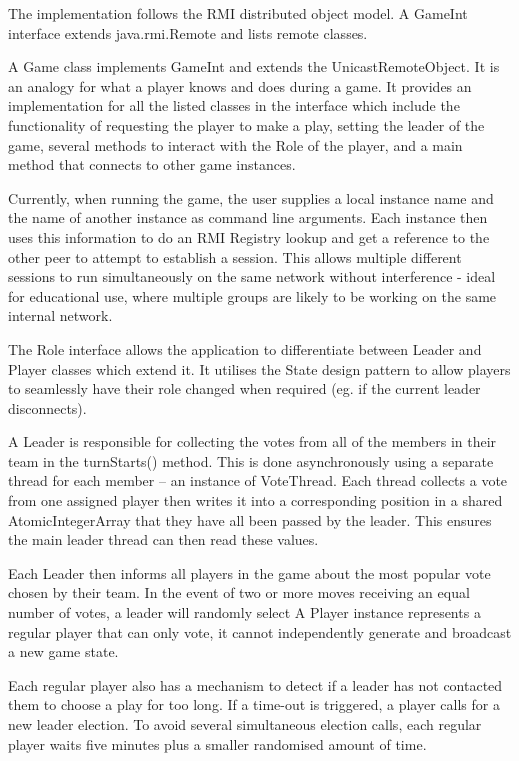 \documentclass[conference]{IEEEtran}
\begin{document}
The implementation follows the RMI distributed object model. A GameInt interface extends java.rmi.Remote and lists remote classes.

A Game class implements GameInt and extends the UnicastRemoteObject. It is an analogy for what a player knows and does during a game. It provides an implementation for all the listed classes in the interface which include the functionality of requesting the player to make a play, setting the leader of the game, several methods to interact with the Role of the player, and a main method that connects to other game instances.
 
Currently, when running the game, the user supplies a local instance name and the name of another instance as command line arguments. Each instance then uses this information to do an RMI Registry lookup and get a reference to the other peer to attempt to establish a session. This allows multiple different sessions to run simultaneously on the same network without interference - ideal for educational use, where multiple groups are likely to be working on the same internal network.

The Role interface allows the application to differentiate between Leader and Player classes which extend it. It utilises the State design pattern to allow players to seamlessly have their role changed when required (eg. if the current leader disconnects).

A Leader is responsible for collecting the votes from all of the members in their team in the turnStarts() method. This is done asynchronously using a separate thread for each member – an instance of VoteThread. Each thread collects a vote from one assigned player then writes it into a corresponding position in a shared AtomicIntegerArray that they have all been passed by the leader. This ensures the main leader thread can then read these values.

Each Leader then informs all players in the game about the most popular vote chosen by their team. In the event of two or more moves receiving an equal number of votes, a leader will randomly select  A Player instance represents a regular player that can only vote, it cannot independently generate and broadcast a new game state. 

Each regular player also has a mechanism to detect if a leader has not contacted them to choose a play for too long. If a time-out is triggered, a player calls for a new leader election. To avoid several simultaneous election calls, each regular player waits five minutes plus a smaller randomised amount of time.
\end{document}
